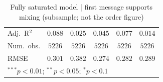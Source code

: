 \begin{table}
\begin{center}
\begin{tabular}{l c c || c c || c}
Adj.\ R$^2$                 & $0.088$        & $0.025$        & $0.045$        & $0.077$        & $0.014$        \\
Num.\ obs.                  & $5226$         & $5226$         & $5226$         & $5226$         & $5226$         \\
RMSE                        & $0.301$        & $0.382$        & $0.274$        & $0.282$        & $0.289$        \\
\hline
\multicolumn{6}{l}{\scriptsize{$^{***}p<0.01$; $^{**}p<0.05$; $^{*}p<0.1$}}
\end{tabular}
\caption{Fully saturated model | first message supports mixing (subsample; not the order figure)}
\label{table:saturated_1}
\end{center}
\end{table}

